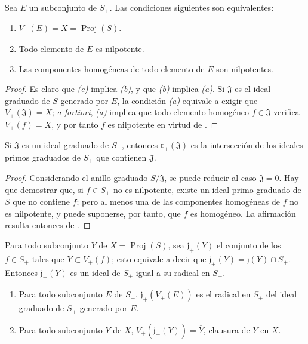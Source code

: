 \documentclass[oneside,10pt]{amsart}
\let\EGAOriginalLabel\label
\renewcommand{\label}[1]{\phantomsection\EGAOriginalLabel{#1}}
\begin{document}
\begin{corollary}[2.3.8]
\label{II.2.3.8-fr}
Sea $E$ un subconjunto de $S_+$.
Las condiciones siguientes son equivalentes:
\begin{enumerate}
  \item[\textit{(a)}] $V_+(E)=X=\operatorname{Proj}(S)$.
  \item[\textit{(b)}] Todo elemento de $E$ es nilpotente.
  \item[\textit{(c)}] Las componentes homogéneas de todo elemento de $E$ son nilpotentes.
\end{enumerate}
\end{corollary}

\begin{proof}
Es claro que \emph{(c)} implica \emph{(b)}, y que \emph{(b)} implica \emph{(a)}.
Si $\mathfrak{J}$ es el ideal graduado de $S$ generado por $E$, la condición \emph{(a)} equivale a exigir que $V_+(\mathfrak{J})=X$; \emph{a fortiori}, \emph{(a)} implica que todo elemento homogéneo $f\in\mathfrak{J}$ verifica $V_+(f)=X$, y por tanto $f$ es nilpotente en virtud de .
\end{proof}

\begin{corollary}[2.3.9]
\label{II.2.3.9-fr}
Si $\mathfrak{J}$ es un ideal graduado de $S_+$, entonces $\mathfrak{r}_+(\mathfrak{J})$ es la intersección de los ideales primos graduados de $S_+$ que contienen $\mathfrak{J}$.
\end{corollary}

\begin{proof}
Considerando el anillo graduado $S/\mathfrak{J}$, se puede reducir al caso $\mathfrak{J}=0$.
Hay que demostrar que, si $f\in S_+$ no es nilpotente, existe un ideal primo graduado de $S$ que no contiene $f$; pero al menos una de las componentes homogéneas de $f$ no es nilpotente, y puede suponerse, por tanto, que $f$ es homogéneo.
La afirmación resulta entonces de .
\end{proof}

\begin{env}[2.3.10]
\label{II.2.3.10-fr}
Para todo subconjunto $Y$ de $X=\operatorname{Proj}(S)$, sea $\mathfrak{j}_+(Y)$ el conjunto de los $f\in S_+$ tales que $Y\subset V_+(f)$; esto equivale a decir que $\mathfrak{j}_+(Y)=\mathfrak{j}(Y)\cap S_+$.
Entonces $\mathfrak{j}_+(Y)$ es un ideal de $S_+$ igual a su radical en $S_+$.
\end{env}

\begin{proposition}[2.3.11]
\label{II.2.3.11-fr}
\begin{enumerate}
  \item[\rm(i)] Para todo subconjunto $E$ de $S_+$, $\mathfrak{j}_+(V_+(E))$ es el radical en $S_+$ del ideal graduado de $S_+$ generado por $E$.
  \item[\rm(ii)] Para todo subconjunto $Y$ de $X$, $V_+(\mathfrak{j}_+(Y))=\overline{Y}$, clausura de $Y$ en $X$.
\end{enumerate}
\end{proposition}
\end{document}
